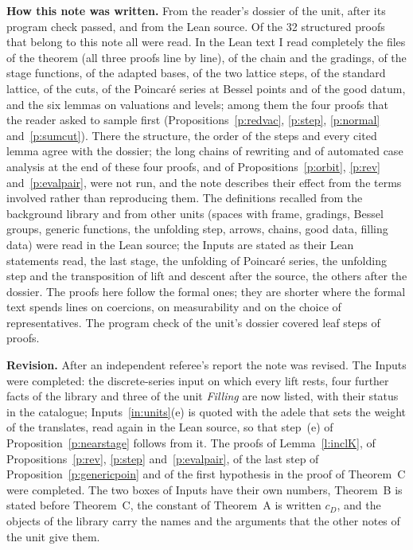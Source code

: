 \documentclass[11pt,a4paper]{article}
\newcommand{\subhead}[1]{\par\addvspace{9pt plus 2pt}\Needspace{4\baselineskip}\noindent\textbf{#1}\enspace\ignorespaces}
\theoremstyle{plainx}
\theoremstyle{uprightx}
\newcommand{\cD}[1]{c_{#1}}                         %
\begin{document}
\subhead{How this note was written.} From the reader's dossier of the unit, after its program check passed, and
from the Lean source. Of the 32 structured proofs that belong to this note all were read. In the Lean text I read
completely the files of the theorem (all three proofs line by line), of the chain and the gradings, of the stage
functions, of the adapted bases, of the two lattice steps, of the standard lattice, of the cuts, of the Poincar\'e
series at Bessel points and of the good datum, and the six lemmas on valuations and levels; among them the four
proofs that the reader asked to sample first (Propositions~\ref{p:redvac}, \ref{p:step}, \ref{p:normal}
and~\ref{p:sumcut}). There the structure, the order of the steps and every cited lemma agree with the dossier; the
long chains of rewriting and of automated case analysis at the end of these four proofs, and of
Propositions~\ref{p:orbit}, \ref{p:rev} and~\ref{p:evalpair}, were not run, and the note describes their effect from
the terms involved rather than reproducing them. The definitions recalled from the background library and from
other units (spaces with frame, gradings, Bessel groups, generic functions, the unfolding step, arrows, chains, good
data, filling data) were read in the Lean source; the Inputs are stated as their Lean statements read, the last
stage, the unfolding of Poincar\'e series, the unfolding step and the transposition of lift and descent after the
source, the others after the dossier. The proofs here follow the formal ones; they are shorter where the formal text
spends lines on coercions, on measurability and on the choice of representatives. The program check of the unit's
dossier covered \UnitSteps{} leaf steps of \UnitProofs{} proofs.

\subhead{Revision.} After an independent referee's report the note was revised. The Inputs were completed: the
discrete-series input on which every lift rests, four further facts of the library and three of the unit
\emph{Filling} are now listed, with their status in the catalogue; Inputs~\ref{in:units}(e) is quoted with the
adele that sets the weight of the translates, read again in the Lean source, so that step~(e) of
Proposition~\ref{p:nearstage} follows from it. The proofs of Lemma~\ref{l:inclK}, of
Propositions~\ref{p:rev}, \ref{p:step} and~\ref{p:evalpair}, of the last step of Proposition~\ref{p:genericpoin}
and of the first hypothesis in the proof of Theorem~C were completed. The two boxes of Inputs have their own
numbers, Theorem~B is stated before Theorem~C, the constant of Theorem~A is written $\cD{D}$, and the objects of
the library carry the names and the arguments that the other notes of the unit give them.
\end{document}
